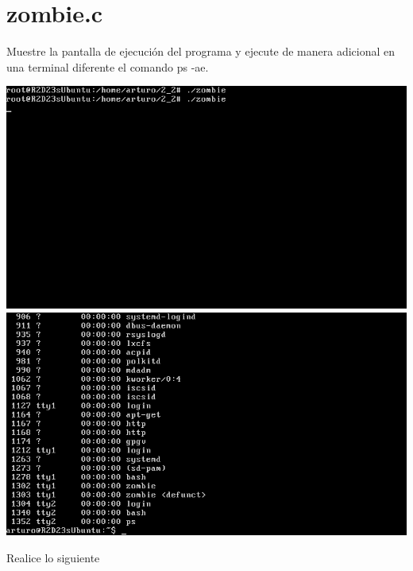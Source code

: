 \section{zombie.c}

	Muestre la pantalla de ejecución del programa y ejecute de manera adicional en una terminal diferente el comando ps -ae.

	\begin{center}
		\includegraphics[width=\linewidth]{imagenes/zombie.png}
		\includegraphics[width=\linewidth]{imagenes/zombie_ps.png}
	\end{center}

	Realice lo siguiente

